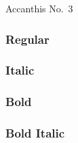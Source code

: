 \documentclass{article}
\begin{document}
\enlargethispage*{6ex}

\begin{center}\LARGE
Accanthis No.~3
\end{center}

\subsubsection*{Regular}
\lipsum[1]

\subsubsection*{Italic}
\textit{\lipsum[2]} 

\subsubsection*{Bold}
\textbf{\lipsum[3]}

\subsubsection*{Bold Italic}

\textbf{\textit{\lipsum[4]}}
\end{document}
